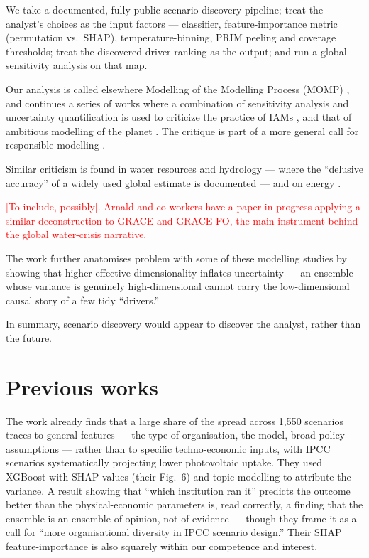 \documentclass[sn-basic]{sn-jnl}%
\begin{document}
We take a documented,
fully public scenario-discovery pipeline; treat the analyst's choices as the
input factors --- classifier, feature-importance metric (permutation vs.\
SHAP), temperature-binning, PRIM peeling and coverage thresholds; treat the
discovered driver-ranking as the output; and run a global sensitivity analysis
on that map. 




Our analysis is called elsewhere Modelling of the Modelling Process (MOMP)  \citep{saltelli_mathematical_2024, saltelli_what_2023,
lachi_robustification_2025}, and continues a series of works where a combination of sensitivity analysis and uncertainty quantification is used to criticize the practice of IAMs \citep{saltelli_sensitivity_2010}, and that of ambitious modelling of the planet \cite{saltelli_bring_2024, Saltelli_Melsen_Puy_2025}. The critique is part of a more general call for responsible modelling \citep{saltelli_five_2020,  Saltelli_Di_Fiore_2023,
saltelli_equations_2026}. 

Similar criticism is found in water resources and hydrology --- where the ``delusive accuracy'' of a widely used global estimate is documented \cite{Puy_Sheikholeslami_Gupta_Hall_Lankford_Lo_Piano_Meier_Pappenberger_Porporato_Vico_et_al._2022} --- and on energy \cite{lo_piano_energy_2025}.

\textcolor{red}{[To include, possibly]. Arnald and co-workers have a paper in progress applying a
similar deconstruction to GRACE and GRACE-FO, the main instrument behind the
global water-crisis narrative.}

The work \cite{Puy_Beneventano_Levin_Lo_Piano_Portaluri_Saltelli_2022} further anatomises problem with some of these modelling  studies by showing that higher effective dimensionality inflates uncertainty ---
an ensemble whose variance is genuinely high-dimensional cannot carry the
low-dimensional causal story of a few tidy ``drivers.''


In summary, scenario discovery would appear to discover the
analyst, rather than the future. 


\section{Previous works}

The work \cite{Jaxa-Rozen_Trutnevyte_2021} already finds that a large share of
the spread across 1,550 scenarios traces to general features --- the type of
organisation, the model, broad policy assumptions --- rather than to specific
techno-economic inputs, with IPCC scenarios systematically projecting lower
photovoltaic uptake. They used XGBoost with SHAP values (their Fig.~6) and
topic-modelling to attribute the variance. A result showing that ``which
institution ran it'' predicts the outcome better than the physical-economic
parameters is, read correctly, a finding that the ensemble is an ensemble of
opinion, not of evidence --- though they frame it as a call
for ``more organisational diversity in IPCC scenario design.'' Their SHAP
feature-importance is also squarely within our competence and interest.
\end{document}
